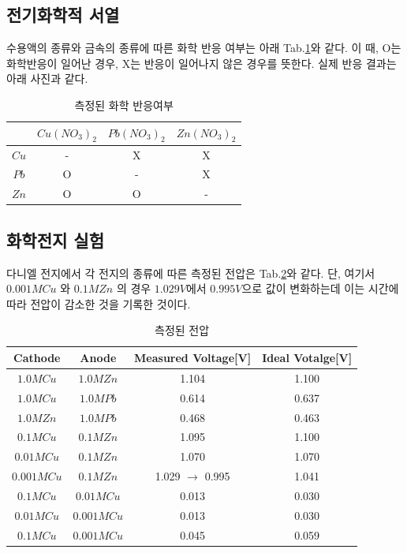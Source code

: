 \documentclass[%
 reprint,
 amsmath,amssymb,
 aps,
]{revtex4-2}
\begin{document}
\subsection{\label{sec:level2}전기화학적 서열}
수용액의 종류와 금속의 종류에 따른 화학 반응 여부는 아래 Tab.\ref{tab:chemreaction}와 같다. 이 때, O는 화학반응이 일어난 경우, X는 반응이 일어나지 않은 경우를 뜻한다. 실제 반응 결과는 아래 사진과 같다.
\begin{table}[]
\begin{tabular}{c|c|c|c} \hline \hline
 & $Cu(NO_{3})_{2}$ & $Pb(NO_{3})_{2}$ & $Zn(NO_{3})_{2}$ \\ \hline
$Cu$ & - & X & X\\ \hline
$Pb$ & O & - & X\\ \hline
$Zn$ & O & O & - \\  \hline \hline 
\end{tabular}
\caption{\label{tab:chemreaction}측정된 화학 반응여부}
\end{table}

\subsection{\label{sec:level2}화학전지 실험}
다니엘 전지에서 각 전지의 종류에 따른 측정된 전압은 Tab.\ref{tab:chemvol}와 같다. 단, 여기서 $0.001M Cu$ 와 $0.1M Zn$ 의 경우 $1.029V$에서 $0.995V$으로 값이 변화하는데 이는 시간에 따라 전압이 감소한 것을 기록한 것이다.
\begin{table}[]
\begin{tabular}{c|c|c|c} \hline \hline
 Cathode & Anode & Measured Voltage[V] & Ideal Votalge[V] \\ \hline
$1.0M Cu$ & $1.0M Zn$ & 1.104 & 1.100 \\ \hline
$1.0M Cu$ & $1.0M Pb$ & 0.614 & 0.637 \\  \hline
$1.0M Zn$ & $1.0M Pb$ & 0.468 & 0.463 \\ \hline
$0.1M Cu$ & $0.1M Zn$ & 1.095 & 1.100 \\ \hline
$0.01M Cu$ & $0.1M Zn$ & 1.070 & 1.070 \\ \hline
$0.001M Cu$ & $0.1M Zn$ & 1.029 $\rightarrow$ 0.995 & 1.041 \\ \hline
$0.1M Cu$ & $0.01M Cu$ & 0.013 & 0.030\\ \hline
$0.01M Cu$ & $0.001M Cu$ & 0.013 & 0.030 \\ \hline
$0.1M Cu$ & $0.001M Cu$ & 0.045 & 0.059 \\ \hline \hline 
\end{tabular}
\caption{\label{tab:chemvol}측정된 전압}
\end{table}
\end{document}
